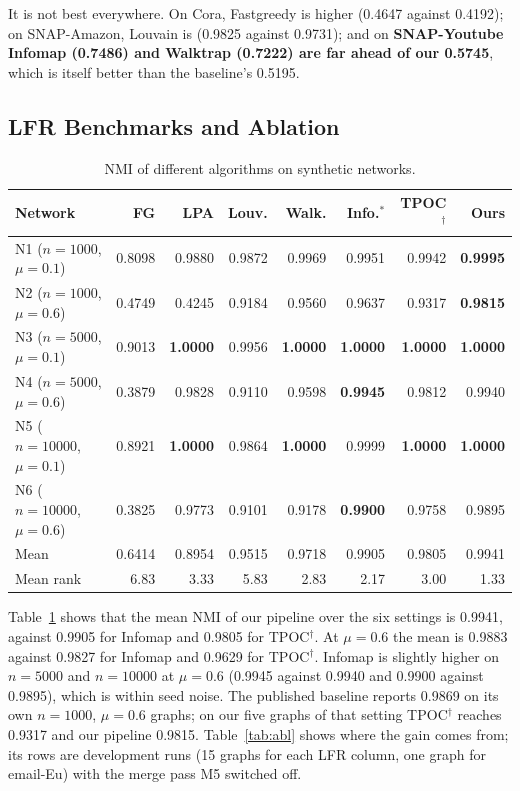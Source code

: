 \documentclass[conference]{IEEEtran}
\begin{document}
It is not best everywhere. On Cora, Fastgreedy is higher (0.4647 against 0.4192); on SNAP-Amazon, Louvain is (0.9825 against 0.9731); and on \textbf{SNAP-Youtube Infomap (0.7486) and Walktrap (0.7222) are far ahead of our 0.5745}, which is itself better than the baseline's 0.5195.

\subsection{LFR Benchmarks and Ablation}
\begin{table}[t]
\centering
\caption{NMI of different algorithms on synthetic networks.}
\label{tab:lfr}
\scriptsize
\begin{tabular}{lrrrrrrr}
\toprule
Network & FG & LPA & Louv. & Walk. & Info.$^{*}$ & TPOC$^{\dagger}$ & Ours \\
\midrule
N1 ($n{=}1000$, $\mu{=}0.1$) & 0.8098 & 0.9880 & 0.9872 & 0.9969 & 0.9951 & 0.9942 & \textbf{0.9995} \\
N2 ($n{=}1000$, $\mu{=}0.6$) & 0.4749 & 0.4245 & 0.9184 & 0.9560 & 0.9637 & 0.9317 & \textbf{0.9815} \\
N3 ($n{=}5000$, $\mu{=}0.1$) & 0.9013 & \textbf{1.0000} & 0.9956 & \textbf{1.0000} & \textbf{1.0000} & \textbf{1.0000} & \textbf{1.0000} \\
N4 ($n{=}5000$, $\mu{=}0.6$) & 0.3879 & 0.9828 & 0.9110 & 0.9598 & \textbf{0.9945} & 0.9812 & 0.9940 \\
N5 ($n{=}10000$, $\mu{=}0.1$) & 0.8921 & \textbf{1.0000} & 0.9864 & \textbf{1.0000} & 0.9999 & \textbf{1.0000} & \textbf{1.0000} \\
N6 ($n{=}10000$, $\mu{=}0.6$) & 0.3825 & 0.9773 & 0.9101 & 0.9178 & \textbf{0.9900} & 0.9758 & 0.9895 \\
\midrule
Mean & 0.6414 & 0.8954 & 0.9515 & 0.9718 & 0.9905 & 0.9805 & 0.9941 \\
Mean rank & 6.83 & 3.33 & 5.83 & 2.83 & 2.17 & 3.00 & 1.33 \\
\bottomrule
\end{tabular}
\end{table}
Table~\ref{tab:lfr} shows that the mean NMI of our pipeline over the six settings is 0.9941, against 0.9905 for Infomap and 0.9805 for TPOC$^{\dagger}$. At $\mu{=}0.6$ the mean is 0.9883 against 0.9827 for Infomap and 0.9629 for TPOC$^{\dagger}$. Infomap is slightly higher on $n{=}5000$ and $n{=}10000$ at $\mu{=}0.6$ (0.9945 against 0.9940 and 0.9900 against 0.9895), which is within seed noise. The published baseline reports 0.9869 on its own $n{=}1000$, $\mu{=}0.6$ graphs; on our five graphs of that setting TPOC$^{\dagger}$ reaches 0.9317 and our pipeline 0.9815. Table~\ref{tab:abl} shows where the gain comes from; its rows are development runs (15 graphs for each LFR column, one graph for email-Eu) with the merge pass M5 switched off.
\end{document}
